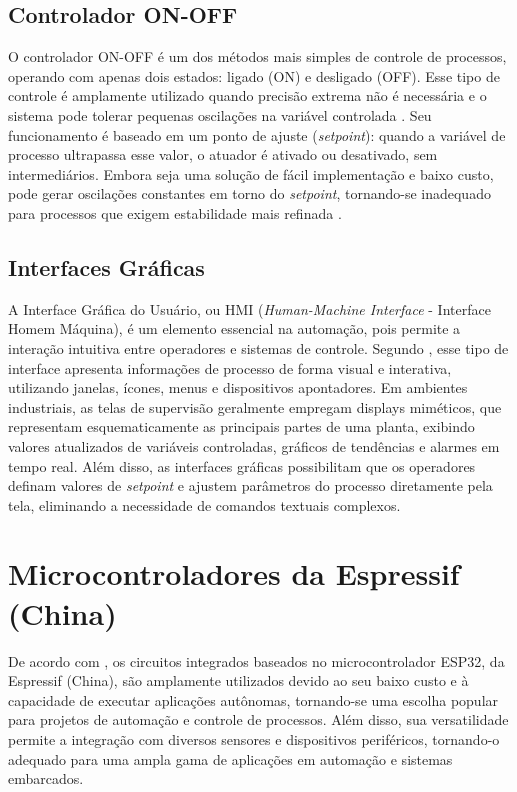 \subsection{Controlador ON-OFF}
O controlador ON-OFF é um dos métodos mais simples de controle de processos, operando com apenas dois estados: ligado (ON) e desligado (OFF). Esse tipo de controle é amplamente utilizado quando precisão extrema não é necessária e o sistema pode tolerar pequenas oscilações na variável controlada \cite{BOLTON2021}. Seu funcionamento é baseado em um ponto de ajuste (\textit{setpoint}): quando a variável de processo ultrapassa esse valor, o atuador é ativado ou desativado, sem intermediários. Embora seja uma solução de fácil implementação e baixo custo, pode gerar oscilações constantes em torno do \textit{setpoint}, tornando-se inadequado para processos que exigem estabilidade mais refinada \cite{SEBORG2016}.

\subsection{Interfaces Gráficas}
A Interface Gráfica do Usuário, ou HMI (\textit{Human-Machine Interface} - Interface Homem Máquina), é um elemento essencial na automação, pois permite a interação intuitiva entre operadores e sistemas de controle. Segundo , esse tipo de interface apresenta informações de processo de forma visual e interativa, utilizando janelas, ícones, menus e dispositivos apontadores. Em ambientes industriais, as telas de supervisão geralmente empregam displays miméticos, que representam esquematicamente as principais partes de uma planta, exibindo valores atualizados de variáveis controladas, gráficos de tendências e alarmes em tempo real. Além disso, as interfaces gráficas possibilitam que os operadores definam valores de \textit{setpoint} e ajustem parâmetros do processo diretamente pela tela, eliminando a necessidade de comandos textuais complexos.



\section{Microcontroladores da Espressif (China)}

De acordo com , os circuitos integrados baseados no microcontrolador ESP32, da Espressif (China), são amplamente utilizados devido ao seu baixo custo e à capacidade de executar aplicações autônomas, tornando-se uma escolha popular para projetos de automação e controle de processos. Além disso, sua versatilidade permite a integração com diversos sensores e dispositivos periféricos, tornando-o adequado para uma ampla gama de aplicações em automação e sistemas embarcados.


